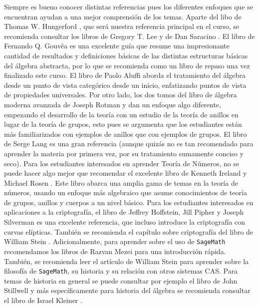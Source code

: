\begin{refsection}
Siempre es bueno conocer distintas referencias pues los diferentes enfoques que se encuentran ayudan a una mejor comprensión de los temas. Aparte del libo de Thomas W. Hungerford \cite{Hun80}, que será nuestra referencia principal en el curso, se recomienda consultar los libros de Gregory T. Lee \cite{Lee18} y de Dan Saracino \cite{Sar08}. El libro de Fernando Q. Gouvêa \cite{Gou12} es una excelente guía que resume una impresionante cantidad de resultados y definiciones básicas de las distintas estructuras básicas del álgebra abstracta, por lo que se recomienda como un libro de repaso una vez finalizado este curso. El libro de Paolo Aluffi \cite{Alu09} aborda el tratamiento del álgebra desde un punto de vista categórico desde un inicio, enfatizando puntos de vista de propiedades universales. Por otro lado, los dos tomos del libro de álgebra moderna avanzada de Joseph Rotman \cite{Rot15} y \cite{Rot17} dan un enfoque algo diferente, empezando el desarrollo de la teoría con un estudio de la teoría de anillos en lugar de la teoría de grupos, esto pues se argumenta que los estudiantes están más familiarizados con ejemplos de anillos que con ejemplos de grupos. El libro de Serge Lang \cite{Lan02} es una gran referencia (aunque quizás no es tan recomendado para aprender la materia por primera vez, por su tratamiento sumamente conciso y seco). Para los estudiantes interesados en aprender Teoría de Números, no se puede hacer algo mejor que recomendar el excelente libro de Kenneth Ireland y Michael Rosen \cite{IR90}. Este libro abarca una amplia gama de temas en la teoría de números, usando un enfoque más algebraico que asume conocimientos de teoría de grupos, anillos y cuerpos a un nivel básico. Para los estudiantes interesados en aplicaciones a la criptografía, el libro de Jeffrey Hoffstein, Jill Pipher y Joseph Silverman \cite{HPS14} es una excelente referencia, que incluso introduce la criptografía con curvas elípticas. También se recomienda el capítulo sobre criptografía del libro de William Stein \cite{Ste09}. Adicionalmente, para aprender sobre el uso de \texttt{SageMath} recomendamos los libros de Razvan Mezei \cite{Mez16} para una introducción rápida. También, se recomienda leer el artículo de William Stein \cite{Ste13} para aprender sobre la filosofía de \texttt{SageMath}, su historia y su relación con otros sistemas CAS. Para temas de historia en general se puede consultar por ejemplo el libro de John Stillwell \cite{Sti10} y más específicamente para historia del álgebra se recomienda consultar el libro de Israel Kleiner \cite{Kle07}.




\nocite{Alu09}
\nocite{Alu21}
\nocite{Lan02}
\nocite{Lan05}
\nocite{Lee18}
\nocite{Hun80}
\nocite{Hun13}
\nocite{AF15}
\nocite{Sti10}
\nocite{Kle07}
\nocite{IR90}
\nocite{Gou12}
\nocite{Kna16a}
\nocite{Kna16b}
\nocite{CE20}


\printbibliography[heading=subbibliography]
\end{refsection}
